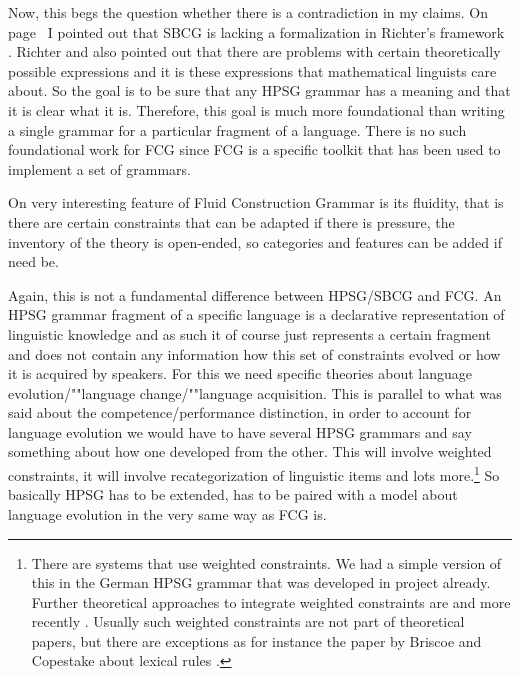 Now, this begs the question whether there is a contradiction in my claims. On
page~\pageref{page-sbcg-formalization} I pointed out that SBCG is lacking a formalization in
Richter's framework \citep{Richter2004a-u}. Richter and also \citet{LM2006a} pointed out that there are problems with
certain theoretically possible expressions and it is these expressions that mathematical linguists care
about. So the goal is to be sure that any HPSG grammar has a meaning and that it is clear what it
is. Therefore, this goal is much more foundational than writing a single grammar for a particular fragment
of a language. There is no such foundational work for FCG since FCG is a specific toolkit that has been used
to implement a set of grammars.


On very interesting feature of Fluid Construction Grammar is its fluidity, that is there are certain
constraints that can be adapted if there is pressure, the inventory of the theory is open-ended, so
categories and features can be added if need be.

Again, this is not a fundamental difference between HPSG/SBCG and FCG. An HPSG grammar fragment of a
specific language is a declarative representation of linguistic knowledge and as such it of course
just represents a certain fragment and does not contain any information how this set of constraints
evolved or how it is acquired by speakers. For this we need specific theories about language
evolution/""language change/""language acquisition. This is parallel to what was said about the
competence/performance distinction, in order to account for language evolution we would have to have
several HPSG grammars and say something about how one developed from the other. This will involve
weighted constraints, it will involve recategorization of linguistic items and lots more.\footnote{%
  There are systems that use weighted constraints. We had a simple version of this in the
  German HPSG grammar that was developed in \verbmobil project \citep{MK2000a} already. Further
  theoretical approaches to integrate weighted constraints are  and more recently
  . Usually such weighted constraints are not part of theoretical papers,
  but there are exceptions as for instance the paper by Briscoe and Copestake about lexical rules \citep{BC99a}.
} So basically HPSG has to be extended, has to be paired with a model about
language evolution in the very same way as FCG is.



